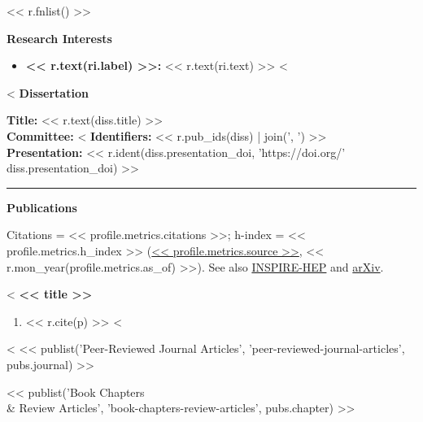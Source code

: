 \documentclass[11pt]{article}
\begin{document}
<< r.fnlist() >>

\medskip

{\Large\textbf{Research Interests}}

\begin{itemize}[leftmargin=*,nosep]
<%
    \item \textbf{<< r.text(ri.label) >>:} << r.text(ri.text) >>
<%
\end{itemize}

\medskip

<%
{\Large\textbf{Dissertation}}

\textbf{Title:} << r.text(diss.title) >>\\[0.3em]
\textbf{Committee:} <%
\textbf{Identifiers:} << r.pub_ids(diss) | join(', ') >>\\[0.3em]
\textbf{Presentation:} << r.ident(diss.presentation_doi, 'https://doi.org/' ~ diss.presentation_doi) >>

\noindent\rule{\linewidth}{1.0pt}

{\Large\textbf{Publications}}

Citations = << profile.metrics.citations >>; h-index = << profile.metrics.h_index >> (\href{<< profile.links.scholar >>}{<< profile.metrics.source >>}, << r.mon_year(profile.metrics.as_of) >>). See also \href{<< profile.links.inspire >>}{INSPIRE-HEP} and \href{<< profile.links.arxiv >>}{arXiv}.

<%
{\large\textbf{<< title >>}}

\begin{enumerate}[leftmargin=*,nosep]
<%
    \item << r.cite(p) >>
<%
\end{enumerate}
<%
<< publist('Peer-Reviewed Journal Articles', 'peer-reviewed-journal-articles', pubs.journal) >>
\medskip

<< publist('Book Chapters \\& Review Articles', 'book-chapters-review-articles', pubs.chapter) >>
\medskip
\end{document}
